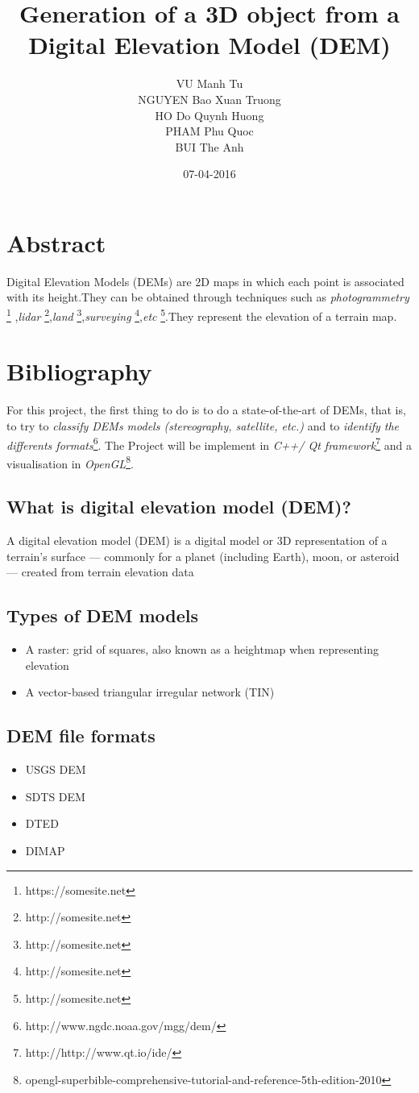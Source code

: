 \documentclass[11pt]{article}
\title{\textbf{Generation of a 3D object from a Digital Elevation Model (DEM)}}
\author{VU Manh Tu\\
		NGUYEN Bao Xuan Truong\\
		HO Do Quynh Huong\\
		PHAM Phu Quoc\\
		BUI The Anh
		}
\date{07-04-2016}
\begin{document}
\maketitle

\section{Abstract}

Digital Elevation Models (DEMs) are 2D maps in which each point is associated with its height.They can be obtained through techniques such as \emph{photogrammetry} \footnote{https://somesite.net} ,\emph{lidar} \footnote{http://somesite.net},\emph{land} \footnote{http://somesite.net},\emph{surveying} \footnote{http://somesite.net},\emph{etc} \footnote{http://somesite.net}.They represent the elevation of a terrain map. 

\section{Bibliography}

For this project, the first thing to do is to do a state-of-the-art of DEMs, that is, to try to \emph{classify DEMs models (stereography, satellite, etc.)} and to \emph{identify the differents formats}\footnote{http://www.ngdc.noaa.gov/mgg/dem/}.
The Project will be implement in \emph{C++/ Qt framework}\footnote{http://http://www.qt.io/ide/} and a visualisation in \emph{OpenGL}\footnote{opengl-superbible-comprehensive-tutorial-and-reference-5th-edition-2010}.

\subsection{What is digital elevation model (DEM)?}
A digital elevation model (DEM) is a digital model or 3D representation of a terrain's surface — commonly for a planet (including Earth), moon, or asteroid — created from terrain elevation data

\subsection{Types of DEM models}
\begin{itemize}
\item A raster: grid of squares, also known as a heightmap when representing elevation
\item A vector-based triangular irregular network (TIN)
\end{itemize}

\subsection{DEM file formats}
\begin{itemize}
\item USGS DEM
\item SDTS DEM
\item DTED
\item DIMAP
\end{itemize}
\end{document}
